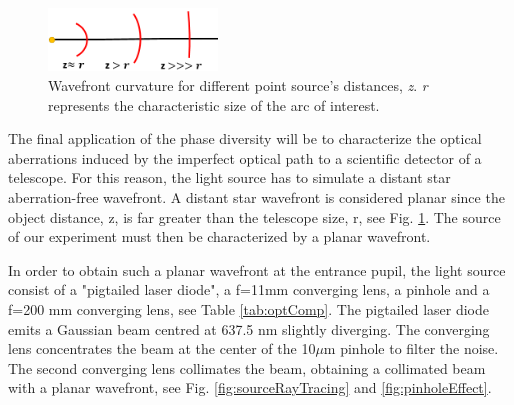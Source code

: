 \begin{minipage}{\linewidth}
\begin{figure}
\centering
\includegraphics[width=0.4\textwidth]{Figures/WFdistantSource.PNG}
\decoRulewrapFig
\caption[Wavefront curvature]{Wavefront curvature for different point source's distances, \textit{z}. \textit{r} represents the characteristic size of the arc of interest.}
\label{fig:WFdistantSource}
\end{figure}

The final application of the phase diversity will be to characterize the optical aberrations induced by the imperfect optical path to a scientific detector of a telescope. For this reason, the light source has to simulate a distant star aberration-free wavefront. A distant star wavefront is considered planar since the object distance, z, is far greater than the telescope size, r, see Fig. \ref{fig:WFdistantSource}. The source of our experiment must then be characterized by a planar wavefront.

In order to obtain such a planar wavefront at the entrance pupil, the light source consist of a "pigtailed laser diode", a f=11mm converging lens, a pinhole and a f=200 mm converging lens, see Table \ref{tab:optComp}. The pigtailed laser diode emits a Gaussian beam centred at 637.5 nm slightly diverging. The converging lens concentrates the beam at the center of the 10$\mu$m pinhole to filter the noise. The second converging lens collimates the beam, obtaining a collimated beam with a planar wavefront, see Fig. \ref{fig:sourceRayTracing} and \ref{fig:pinholeEffect}.

\end{minipage}

